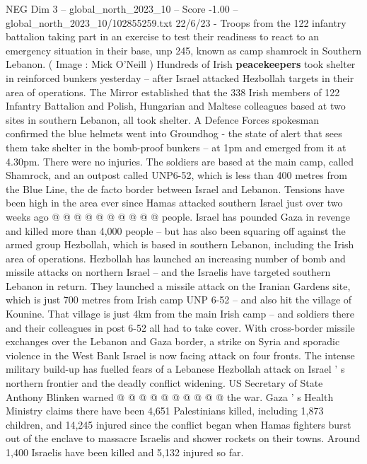 \begin{textsample}{NEG Dim 3 – global\_north\_2023\_10 – Score -1.00 – global\_north\_2023\_10/102855259.txt}  \label{ex:f3_neg_182}
22/6/23 - Troops from the 122 infantry battalion taking part in an exercise to test their readiness to react to an emergency situation in their base, unp 245, known as camp shamrock in Southern Lebanon. ( Image : Mick O'Neill ) Hundreds of Irish \textbf{peacekeepers} took shelter in reinforced bunkers yesterday -- after Israel attacked Hezbollah targets in their area of operations.
The Mirror established that the 338 Irish members of 122 Infantry Battalion and Polish, Hungarian and Maltese colleagues based at two sites in southern Lebanon, all took shelter.
A Defence Forces spokesman confirmed the blue helmets went into Groundhog - the state of alert that sees them take shelter in the bomb-proof bunkers -- at 1pm and emerged from it at 4.30pm.
There were no injuries.
The soldiers are based at the main camp, called Shamrock, and an outpost called UNP6-52, which is less than 400 metres from the Blue Line, the de facto border between Israel and Lebanon.
Tensions have been high in the area ever since Hamas attacked southern Israel just over two weeks ago @ @ @ @ @ @ @ @ @ @ people.
Israel has pounded Gaza in revenge and killed more than 4,000 people -- but has also been squaring off against the armed group Hezbollah, which is based in southern Lebanon, including the Irish area of operations.
Hezbollah has launched an increasing number of bomb and missile attacks on northern Israel -- and the Israelis have targeted southern Lebanon in return.
They launched a missile attack on the Iranian Gardens site, which is just 700 metres from Irish camp UNP 6-52 -- and also hit the village of Kounine.
That village is just 4km from the main Irish camp -- and soldiers there and their colleagues in post 6-52 all had to take cover.
With cross-border missile exchanges over the Lebanon and Gaza border, a strike on Syria and sporadic violence in the West Bank Israel is now facing attack on four fronts.
The intense military build-up has fuelled fears of a Lebanese Hezbollah attack on Israel ' s northern frontier and the deadly conflict widening.
US Secretary of State Anthony Blinken warned @ @ @ @ @ @ @ @ @ @ the war.
Gaza ' s Health Ministry claims there have been 4,651 Palestinians killed, including 1,873 children, and 14,245 injured since the conflict began when Hamas fighters burst out of the enclave to massacre Israelis and shower rockets on their towns.
Around 1,400 Israelis have been killed and 5,132 injured so far.

\end{textsample}
